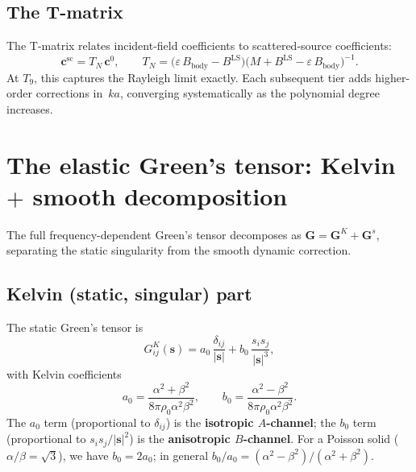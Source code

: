 \documentclass[11pt,a4paper]{article}
\newcommand{\bG}{\bm{G}}
\newcommand{\bs}{\bm{s}}
\newcommand{\BLS}{B^{\mathrm{LS}}}
\theoremstyle{plain}
\theoremstyle{definition}
\theoremstyle{remark}
\begin{document}
\subsection{The T-matrix}

The T-matrix relates incident-field coefficients to scattered-source
coefficients:
\begin{equation}
  \bm{c}^{\mathrm{sc}} = T_N\,\bm{c}^0,
  \qquad
  T_N = \bigl(\varepsilon\,B_{\mathrm{body}} - \BLS\bigr)
        \bigl(M + \BLS - \varepsilon\,B_{\mathrm{body}}\bigr)^{-1}.
  \label{eq:Tmatrix-def}
\end{equation}
At $T_9$, this captures the Rayleigh limit exactly.  Each subsequent
tier adds higher-order corrections in~$ka$, converging systematically
as the polynomial degree increases.


\section{The elastic Green's tensor: Kelvin $+$ smooth decomposition}
\label{sec:greens-tensor}

The full frequency-dependent Green's tensor decomposes as
$\bG = \bG^K + \bG^s$, separating the static singularity from the
smooth dynamic correction.

\subsection{Kelvin (static, singular) part}

The static Green's tensor is
\begin{equation}
  G^K_{ij}(\bs) = a_0\,\frac{\delta_{ij}}{|\bs|}
  + b_0\,\frac{s_i s_j}{|\bs|^3},
  \label{eq:kelvin}
\end{equation}
with Kelvin coefficients
\begin{equation}
  a_0 = \frac{\alpha^2 + \beta^2}{8\pi\rho_0\alpha^2\beta^2},
  \qquad
  b_0 = \frac{\alpha^2 - \beta^2}{8\pi\rho_0\alpha^2\beta^2}.
  \label{eq:kelvin-ab}
\end{equation}
The $a_0$ term (proportional to $\delta_{ij}$) is the
\textbf{isotropic $A$-channel}; the $b_0$ term (proportional to
$s_i s_j/|\bs|^2$) is the \textbf{anisotropic $B$-channel}.  For a
Poisson solid ($\alpha/\beta = \sqrt{3}$), we have $b_0 = 2a_0$; in
general $b_0/a_0 = (\alpha^2 - \beta^2)/(\alpha^2 + \beta^2)$.
\end{document}
